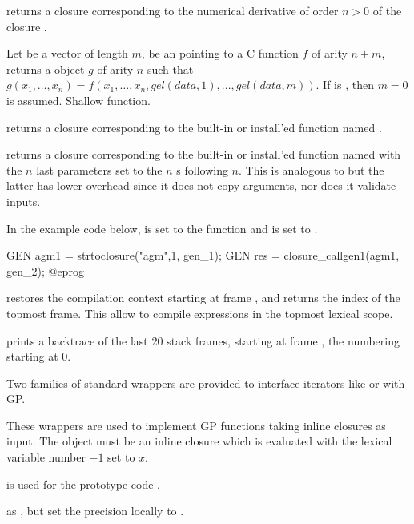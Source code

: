  returns a closure corresponding to
the numerical derivative of order $n > 0$ of the closure .

Let  be a vector of length $m$,  be an 
pointing to a C function $f$ of arity $n+m$, returns a  object
$g$ of arity $n$ such that
$g(x_1,\ldots,x_n)=f(x_1,\ldots,x_n,gel(data,1),...,gel(data,m))$. If
 is , then $m=0$ is assumed. Shallow function.

 returns a closure corresponding to the
built-in or install'ed function named .

 returns a closure
corresponding to the built-in or install'ed function named  with the
$n$ last parameters set to the $n$ s following $n$. This is
analogous to  but the latter has
lower overhead since it does not copy arguments, nor does it validate inputs.

In the example code below,  is set to the function
 and  is set to .

\bprog
  GEN agm1 = strtoclosure("agm",1, gen_1);
  GEN res = closure_callgen1(agm1, gen_2);
@eprog

 restores the compilation context starting
at frame , and returns the index of the topmost frame. This allow to
compile expressions in the topmost lexical scope.

 prints a backtrace of the last $20$ stack
frames, starting at frame , the numbering starting at $0$.

Two families of standard wrappers are provided to interface iterators like
 or  with GP.

These wrappers are used to implement GP functions taking inline closures as
input. The object  must be an inline closure which is evaluated
with the lexical variable number $-1$ set to $x$.

 is used for the prototype code .

 as , but
set the precision locally to .

